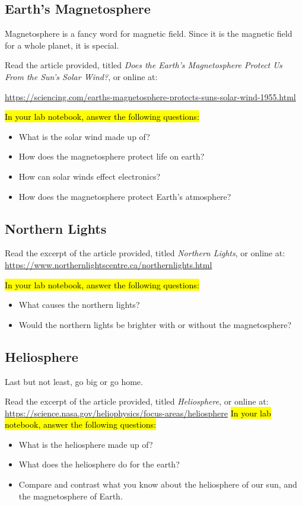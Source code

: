 \documentclass[14pt, fleqn, paper=letter, oneside]{scrartcl}
\begin{document}
\begin{multicols}{2}
\subsection{Earth's Magnetosphere}
Magnetosphere is a fancy word for magnetic field.
Since it is the magnetic field for a whole planet, it is special.

Read the article provided, titled \emph{Does the Earth's Magnetosphere Protect Us From the Sun's Solar Wind?}, or online at:

\url{https://sciencing.com/earths-magnetosphere-protects-suns-solar-wind-1955.html}

\hl{In your lab notebook, answer the following questions:}
\begin{itemize}
\item What is the solar wind made up of?
\item How does the magnetosphere protect life on earth?
\item How can solar winds effect electronics?
\item How does the magnetosphere protect Earth's atmosphere?
\end{itemize}

\subsection{Northern Lights}
Read the excerpt of the article provided, titled \emph{Northern Lights}, or online at:
\url{https://www.northernlightscentre.ca/northernlights.html}

\hl{In your lab notebook, answer the following questions:}
\begin{itemize}
\item What causes the northern lights?
\item Would the northern lights be brighter with or without the magnetosphere?
\end{itemize}


\subsection{Heliosphere}
Last but not least, go big or go home.

Read the excerpt of the article provided, titled \emph{Heliosphere}, or online at:
\url{https://science.nasa.gov/heliophysics/focus-areas/heliosphere}
\hl{In your lab notebook, answer the following questions:}
\begin{itemize}
\item What is the heliosphere made up of?
\item What does the heliosphere do for the earth?
\item Compare and contrast what you know about the heliosphere of our sun, and the magnetosphere of Earth.
\end{itemize}

\end{multicols}
\end{document}
